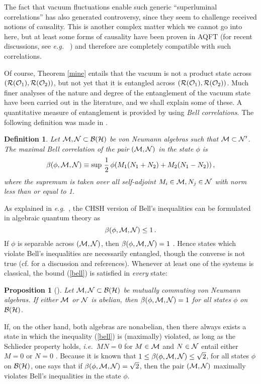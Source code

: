 \documentclass[12pt]{article}
\newtheorem{prop}[theorem]{Proposition}
\newtheorem{definition}[theorem]{Definition}
\newcommand{\ie}{{\it i.e.\ }}
\newcommand{\eg}{{\it e.g.\ }}
\def\Bs{{\cal B}}
\def\Hs{{\cal H}}
\def\Ms{{\cal M}}
\def\Ns{{\cal N}}
\def\Os{{\cal O}}
\def\Rs{{\cal R}}
\def\pair{{(\Ms,\Ns)}}
\def\pairf{{(\Rs(\Os_1),\Rs(\Os_2))}}
\def\cM{{\cal M}}
\def\cN{{\cal N}}
\begin{document}
     The fact that vacuum fluctuations enable such generic
``superluminal correlations'' has also generated controversy, since
they seem to challenge received notions of causality. This is another
complex matter which we cannot go into here, but at least some forms of 
causality have been proven in AQFT (for recent discussions, see \eg 
\cite{ReSu1,But}) and therefore are completely compatible with such 
correlations.

     Of course, Theorem \ref{mine} entails that the vacuum is not a
product state across $\pairf$, but not yet that it is entangled across
$\pairf$. Much finer analyses of the nature and degree of the
entanglement of the vacuum state have been carried out in the
literature, and we shall explain some of these. A quantitative measure
of entanglement is provided by using {\it Bell correlations}.  The
following definition was made in \cite{SW1}.

\begin{definition} Let $\Ms,\Ns \subset \Bs(\Hs)$ be von Neumann algebras
such that $\Ms \subset \Ns{}'$. The maximal Bell correlation of
the pair $(\cM,\cN)$ in the state $\phi$ is
%
$$\beta(\phi,\cM,\cN) \equiv \sup \, \frac{1}{2} \,
\phi(M_1(N_1+N_2)+M_2(N_1-N_2))\, , $$
%
where the supremum is taken over all self-adjoint
$M_i \in \cM, N_j \in \cN$ with norm less than or equal to 1.
\end{definition}

     As explained in \eg \cite{SW2}, the CHSH version
of Bell's inequalities can be formulated in algebraic quantum
theory as
%
\begin{equation}  \label{bell}
\beta(\phi,\cM,\cN) \leq 1 \, .
\end{equation}
%
If $\phi$ is separable across $\pair$, then $\beta(\phi,\Ms,\Ns) = 1$
\cite{SW2}. Hence states which violate Bell's inequalities are necessarily
entangled, though the converse is not true (cf. \cite{WW} for a
discussion and references). Whenever at least one of the systems is 
classical, the bound (\ref{bell}) is satisfied in {\it every} state:

\begin{prop} [\cite{SW2}]
Let $\Ms,\Ns \subset \Bs(\Hs)$ be mutually commuting von Neumann algebras.
If either $\Ms$ or $\Ns$ is abelian, then $\beta(\phi,\Ms,\Ns) = 1$
for all states $\phi$ on $\Bs(\Hs)$.
\end{prop}

     If, on the other hand, both algebras are nonabelian, then there
always exists a state in which the inequality (\ref{bell}) is (maximally) 
violated, as long as the Schlieder property holds, \ie $MN = 0$ for
$M \in \Ms$ and $N \in \Ns$ entail either $M=0$ or $N = 0$ \cite{Lan}. 
Because it is known \cite{Cir,SW2} that 
$1 \leq \beta(\phi,\cM,\cN) \leq \sqrt{2}$, for all states $\phi$ on 
$\Bs(\Hs)$, one says that if
$\beta(\phi,\cM,\cN) = \sqrt{2}$, then the pair $(\Ms,\Ns)$ maximally
violates Bell's inequalities in the state $\phi$.
\end{document}
